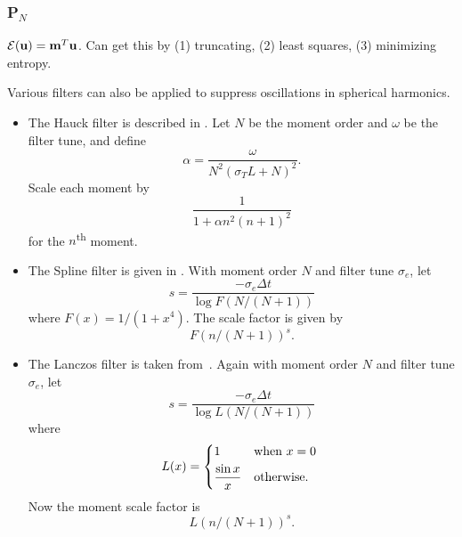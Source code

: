 \documentclass{article}
\newcommand{\closure}[1]{\ensuremath{\mathcal{E}(#1)}}
\begin{document}
\subsubsection{P$_N$}
$\closure{\bu} = \bm^T \bu$.
Can get this by (1) truncating, (2) least squares, (3) minimizing entropy.

Various filters can also be applied to suppress oscillations in spherical harmonics.

\begin{itemize}
    \item The Hauck filter is described in \cite{Hauck-McClarren-2010}.
    Let $N$ be the moment order and $\omega$ be the filter tune, and define
    \begin{equation}
        \alpha = \frac{\omega}{N^2 (\sigma_T L + N)^2}.
    \end{equation}
    Scale each moment by
    \begin{equation}
        \frac{1}{1 + \alpha n^2 (n+1)^2}
    \end{equation}
    for the $n$\textsuperscript{th} moment.

    \item The Spline filter is given in \cite{Radice-2013}.
    With moment order $N$ and filter tune $\sigma_e$, let
    \begin{equation}
        s = \frac{-\sigma_e \Delta t}{\log F(N/(N+1))}
    \end{equation}
    where $F(x) = 1/(1 + x^4)$. The scale factor is given by
    \begin{equation}
        F(n/(N+1))^s.
    \end{equation}

    \item The Lanczos filter is taken from~\cite{Radice-2013}.
    Again with moment order $N$ and filter tune $\sigma_e$, let
    \begin{equation}
        s = \frac{-\sigma_e \Delta t}{\log L(N / (N+1))}
    \end{equation}
    where
    \begin{equation}
        L(x) = \begin{dcases*}
            1 & when $x=0$ \\
            \frac{\sin x}{x} & otherwise.
        \end{dcases*}
    \end{equation}
    Now the moment scale factor is
    \begin{equation}
        L(n / (N+1))^s.
    \end{equation}
\end{itemize}
\end{document}
